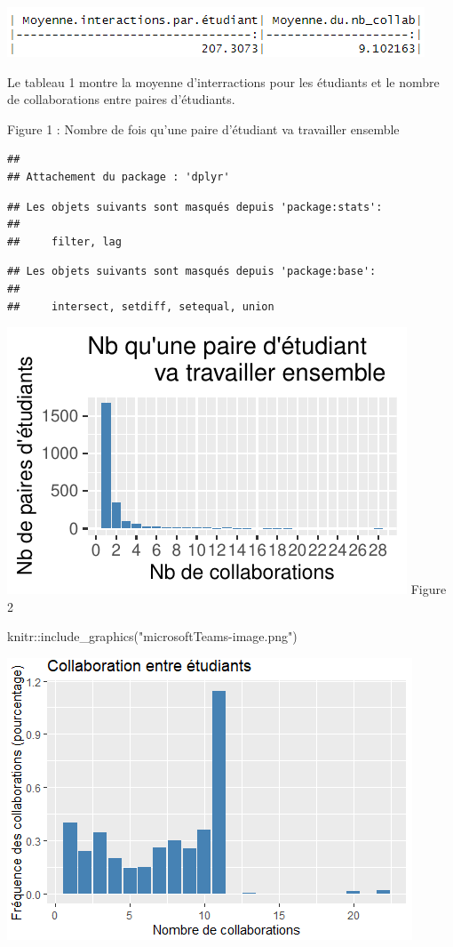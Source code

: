 \documentclass[9pt,twocolumn,twoside,]{pnas-new}
\newenvironment{Shaded}{\begin{snugshade}}{\end{snugshade}}
\newcommand{\FunctionTok}[1]{\textcolor[rgb]{0.00,0.00,0.00}{#1}}
\newcommand{\NormalTok}[1]{#1}
\newcommand{\SpecialCharTok}[1]{\textcolor[rgb]{0.00,0.00,0.00}{#1}}
\newcommand{\StringTok}[1]{\textcolor[rgb]{0.31,0.60,0.02}{#1}}
\begin{document}
\includegraphics[width=1\linewidth]{moyenne}

Le tableau 1 montre la moyenne d'interractions pour les étudiants et le
nombre de collaborations entre paires d'étudiants.

Figure 1 : Nombre de fois qu'une paire d'étudiant va travailler ensemble

\begin{verbatim}
## 
## Attachement du package : 'dplyr'
\end{verbatim}

\begin{verbatim}
## Les objets suivants sont masqués depuis 'package:stats':
## 
##     filter, lag
\end{verbatim}

\begin{verbatim}
## Les objets suivants sont masqués depuis 'package:base':
## 
##     intersect, setdiff, setequal, union
\end{verbatim}

\includegraphics{Rmarkdown_Reseau_Ecologique_files/figure-latex/unnamed-chunk-4-1.pdf}
Figure 2

\begin{Shaded}
\begin{Highlighting}[]
\NormalTok{knitr}\SpecialCharTok{::}\FunctionTok{include\_graphics}\NormalTok{(}\StringTok{"microsoftTeams{-}image.png"}\NormalTok{)}
\end{Highlighting}
\end{Shaded}

\includegraphics[width=0.8\linewidth]{microsoftTeams-image}
\end{document}

